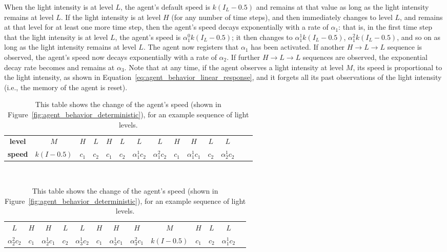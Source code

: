 When the light intensity is at level $L$, the agent's default speed is $k\left(I_L - 0.5\right)$ and remains at that value as long as the light intensity remains at level $L$. If the light intensity is at level $H$ (for any number of time steps), and then immediately changes to level $L$, and remains at that level for at least one more time step, then the agent's speed decays exponentially with a rate of $\alpha_1$: that is, in the first time step that the light intensity is at level $L$, the agent's speed is $\alpha_1^{0}k\left(I_L-0.5\right)$; it then changes to $\alpha_1^{1} k \left(I_L-0.5\right)$, $\alpha_1^{2} k \left(I_L-0.5\right)$, and so on as long as the light intensity remains at level $L$. The agent now registers that $\alpha_1$ has been activated. If another $H\rightarrow L\rightarrow L$ sequence is observed, the agent's speed now decays exponentially with a rate of $\alpha_2$. If further $H\rightarrow L\rightarrow L$ sequences are observed, the exponential decay rate becomes and remains at $\alpha_3$. Note that at any time, if the agent observes a light intensity at level $M$, its speed is proportional to the light intensity, as shown in Equation~\ref{eq:agent_behavior_linear_response}, and it forgets all its past observations of the light intensity (i.e., the memory of the agent is reset). 
\begin{table}[!t]
	\caption{\label{tab:example_sequence}This table shows the change of the agent's speed (shown in Figure~\ref{fig:agent_behavior_deterministic}), for an example sequence of light levels.}
	\renewcommand{\arraystretch}{1.5}
	\centering
		\begin{tabular}{cccccccccccccc}
			\hline 
			\textbf{level} & $M$ & $H$ & $L$ & $H$ & $L$ & $L$ & $L$ & $H$ & $H$ & $L$ & $L$\tabularnewline
			\textbf{speed} & $k(I - 0.5)$ & $c_1$ & $c_2$ & $c_1$ & $c_2$ & $\alpha_{1}^{1}  c_2$ & $\alpha_{1}^{2}  c_2$ & $c_1$ & $\alpha_{1}^{1}  c_1$ & $c_2$ & $\alpha_{2}^{1}  c_2$ 					\tabularnewline  %
			\hline 
		\end{tabular}\\
		\vspace{5 mm}
		\begin{tabular}{ccccccccccccc}
			\hline 
			$L$ & $H$ & $H$ & $L$ & $L$ & $H$ & $H$ & $H$ & $M$ & $H$ & $L$ & $L$\tabularnewline
			$\alpha_{2}^{2}  c_2$ & $c_1$ & $\alpha_{2}^{1}  c_1$ & $c_2$ & $\alpha_{3}^{1}  c_2$ & $c_1$  & $\alpha_{3}^{1}  c_1$ & $\alpha_{3}^{2}  c_1$ & $k(I-0.5)$ & $c_1$ & $c_2$ & $\alpha_{1}^{1} c_2$\tabularnewline
			\hline 
		\end{tabular}
\end{table}

